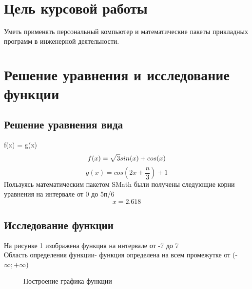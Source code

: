 \documentclass[russian,utf8,nocolumnxxxi,nocolumnxxxii]{eskdtext}
\begin{document}
\maketitle

\tableofcontents


\newpage

\section{Цель курсовой работы}
Уметь применять персональный компьютер и математические пакеты прикладных программ в инженерной деятельности.
\clearpage
\newpage
\section{Решение уравнения и исследование функции}
\subsection{Решение уравнения вида} f(x) = g(x)
\begin{equation}
f(x)= \sqrt{3\mathstrut}sin(x) + cos(x)
\end{equation}
\begin{equation}
g(x)=cos\left(2x+\frac n{3} \right)+1
\end{equation}
Пользуясь математическим пакетом SMath были получены следующие корни уравнения на интервале от 0 до 5п/6\\
\begin{equation}
x=2.618
\end{equation}
\subsection {Исследование функции}
На рисунке 1 изображена функция на интервале от -7 до 7\\ 
Область определения функции- функция определена на всем промежутке от (-{$\infty;+\infty$})
\begin{figure}[!ht]
    \centering
{} 
    \caption{Построение графика функции}
    \label{fig:my_label}
\end{figure}
\end{document}
